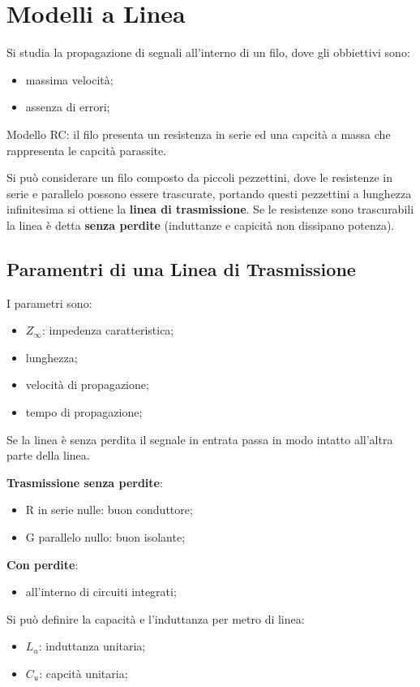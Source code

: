 \documentclass[12pt]{article}
\begin{document}
\section{Modelli a Linea}
Si studia la propagazione di segnali all'interno di un filo, dove gli obbiettivi sono:
\begin{itemize}
    \item massima velocit\`a;
    \item assenza di errori;
\end{itemize}

Modello RC: il filo presenta un resistenza in serie ed una capcit\`a a massa che rappresenta le capcit\`a parassite.

Si pu\`o considerare un filo composto da piccoli pezzettini, dove le resistenze in serie e parallelo possono essere trascurate, portando questi pezzettini a lunghezza infinitesima si ottiene la \textbf{linea di trasmissione}. Se le resistenze sono trascurabili la linea \`e detta \textbf{senza perdite} (induttanze e capicit\`a non dissipano potenza).

\subsection{Paramentri di una Linea di Trasmissione}
I parametri sono:
\begin{itemize}
    \item $Z_{\infty}$: impedenza caratteristica;
    \item lunghezza;
    \item velocit\`a di propagazione;
    \item tempo di propagazione;
\end{itemize}

Se la linea \`e senza perdita il segnale in entrata passa in modo intatto all'altra parte della linea.

\textbf{Trasmissione senza perdite}:
\begin{itemize}
    \item R in serie nulle: buon conduttore;
    \item G parallelo nullo: buon isolante;
\end{itemize}

\textbf{Con perdite}:
\begin{itemize}
    \item all'interno di circuiti integrati;
\end{itemize}

Si pu\`o definire la capacit\`a e l'induttanza per metro di linea:
\begin{itemize}
    \item $L_u$: induttanza unitaria;
    \item $C_u$: capcit\`a unitaria;
\end{itemize}
\end{document}
